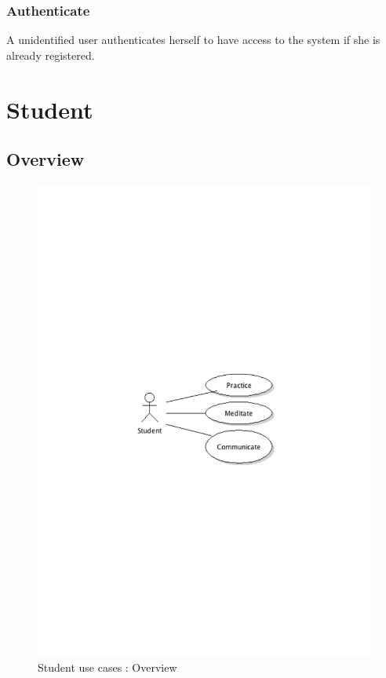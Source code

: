 		\subsubsection{Authenticate}A unidentified user authenticates herself to have access to the system if she is already registered.
\newpage
\section{Student}
	\subsection{Overview}
		\begin{figure}[ht]
			\begin{center}
				\includegraphics[width=\textwidth,  trim=2cm 12cm 2cm 12cm]{UML_figure/use_cases/student/UC_Student_General.pdf}
				\caption{Student use cases : Overview}
			\end{center}
		\end{figure}
